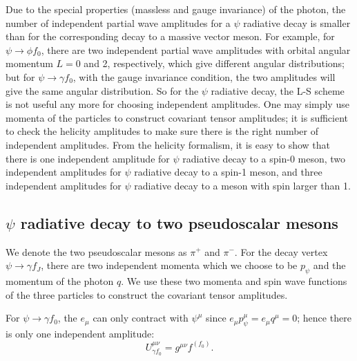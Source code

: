 Due to the special properties (massless and gauge invariance) of
the photon, the number of independent partial wave amplitudes for
a $\psi$ radiative decay is smaller than for the corresponding
decay to a massive vector meson. For example, for $\psi\to\phi
f_0$, there are two independent partial wave amplitudes with
orbital angular momentum $L=0$ and 2, respectively, which give
different angular distributions; but for $\psi\to\gamma f_0$, with
the gauge invariance condition, the two amplitudes will give the
same angular distribution. So for the $\psi$ radiative decay, the
L-S scheme is not useful any more for choosing independent
amplitudes. One may simply use momenta of the particles to
construct covariant tensor amplitudes;  it is sufficient to check
the helicity amplitudes to make sure there is the right number of
independent amplitudes. From the helicity formalism, it is easy to
show that there is one independent amplitude for $\psi$ radiative
decay to a spin-0 meson, two independent amplitudes for $\psi$
radiative decay to a spin-1 meson, and three independent
amplitudes for  $\psi$ radiative decay to a meson with spin larger
than 1.

\subsection{$\psi$ radiative decay to two pseudoscalar mesons}

We denote the two pseudoscalar mesons as $\pi^+$ and $\pi^-$. For
the decay vertex $\psi\to\gamma f_J$, there are two independent
momenta which we choose to be $p_\psi$ and the momentum of the
photon $q$. We use these two momenta and spin wave functions of
the three particles to construct the covariant tensor amplitudes.

For $\psi\to\gamma f_0$, the $e_\mu$ can only contract with
$\psi^\mu$ since $e_\mu p_\psi^\mu=e_\mu q^\mu=0$; hence there is
only one independent amplitude:
\begin{equation}
U^{\mu\nu}_{\gamma f_0} = g^{\mu\nu} f^{(f_0)}.
\end{equation}

